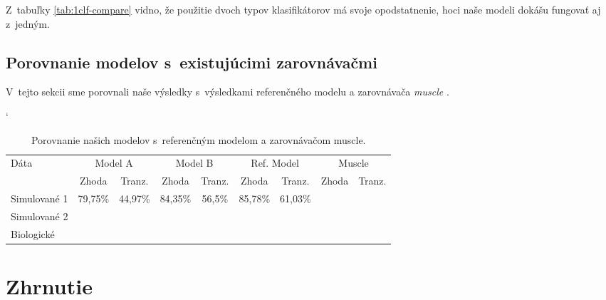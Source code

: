 Z~tabuľky \ref{tab:1clf-compare} vidno, že použitie dvoch typov klasifikátorov má svoje opodstatnenie, hoci naše modeli dokášu fungovať aj z~jedným.

\subsection{Porovnanie modelov s~existujúcimi zarovnávačmi}

V~tejto sekcii sme porovnali naše výsledky s~výsledkami referenčného modelu a zarovnávača \textit{muscle} \cite{edgar2004muscle}.

\begin{table}[htp]
\catcode`
\centering
\begin{tabular}{lcccccccc}
\toprule
\multirow{2}{*}{Dáta} &
\multicolumn{2}{c}{Model A} &
\multicolumn{2}{c}{Model B } &
\multicolumn{2}{c}{Ref. Model } &
\multicolumn{2}{c}{Muscle} \\
\cmidrule(r){2-3}\cmidrule(lr){4-5}\cmidrule(lr){6-7}\cmidrule(l){8-9}
& Zhoda & Tranz. & Zhoda & Tranz. & Zhoda & Tranz. & Zhoda & Tranz.\\
\midrule
Simulované 1 & 79,75\% & 44,97\% & 84,35\% & 56,5\% & 85,78\% & 61,03\%\\
Simulované 2 &  & & \\
Biologické &  & & \\
\bottomrule
\end{tabular}
\caption[Porovnanie s~existujúcimi zarovnávačmi]{Porovnanie našich modelov s~referenčným modelom a zarovnávačom muscle.}
\label{tab:window-compare}
\end{table}

\section{Zhrnutie}

